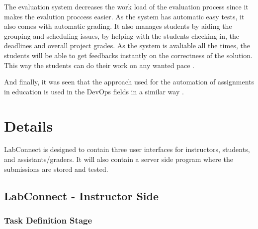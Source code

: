 \documentclass[a4paper, 12pt]{article}
\begin{document}
    The evaluation system decreases the work load of the evaluation process since it makes the evalution proccess easier.
    As the system has automatic easy tests, it also comes with automatic grading. It also manages students by aiding the
    grouping and scheduling issues, by helping with the students checking in, the deadlines and overall project grades.
    As the system is avaliable all the times, the students will be able to get feedbacks instantly on the correctness of
    the solution. This way the students can do their work on any wanted pace \cite{Nogueira2011}.

    And finally, it was seen that the approach used for the automation of assignments in education is used in the DevOps fields in a similar way \cite{Faber2020}.

    \section{Details}

    LabConnect is designed to contain three user interfaces for instructors, students,
    and assistants/graders. It will also contain a server side program where the submissions
    are stored and tested.

    \subsection{LabConnect - Instructor Side}

    \subsubsection{Task Definition Stage}
\end{document}
